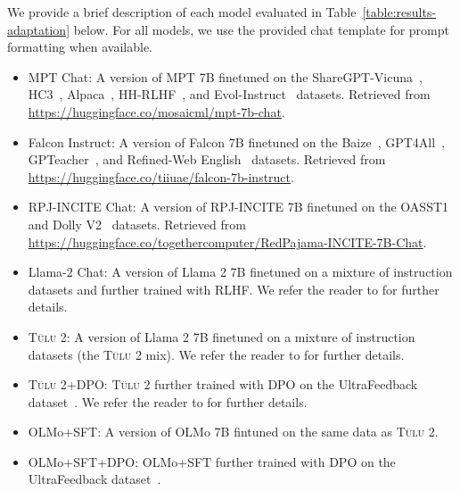 \documentclass[11pt]{article}
\newcommand{\olmo}{OLMo\xspace}
\newcommand{\tulu}{\textsc{T\"ulu}\xspace}
\begin{document}
We provide a brief description of each model evaluated in Table~\ref{table:results-adaptation} below. For all models, we use the provided chat template for prompt formatting when available. 
\begin{itemize}[leftmargin=*]
    \item MPT Chat: A version of MPT 7B finetuned on the ShareGPT-Vicuna~\citep{vicuna2023}, HC3~\citep{guo-etal-2023-hc3}, Alpaca~\citep{alpaca}, HH-RLHF~\citep{bai2022training}, and Evol-Instruct~\citep{xu2024wizardlm} datasets. Retrieved from \url{https://huggingface.co/mosaicml/mpt-7b-chat}.
    \item Falcon Instruct: A version of Falcon 7B finetuned on the Baize~\citep{xu2023baize}, GPT4All~\citep{gpt4all}, GPTeacher~\citep{gpteacher}, and Refined-Web English~\citep{penedo2023therd} datasets. Retrieved from \url{https://huggingface.co/tiiuae/falcon-7b-instruct}.
    \item RPJ-INCITE Chat: A version of RPJ-INCITE 7B finetuned on the OASST1~\citep{kopf2023openassistant} and Dolly V2~\citep{DatabricksBlog2023DollyV2} datasets. Retrieved from \url{https://huggingface.co/togethercomputer/RedPajama-INCITE-7B-Chat}.
    \item Llama-2 Chat: A version of Llama 2 7B finetuned on a mixture of instruction datasets and further trained with RLHF. We refer the reader to \citet{touvron2023llama2} for further details.
    \item \tulu 2: A version of Llama 2 7B finetuned on a mixture of instruction datasets (the \tulu 2 mix). We refer the reader to \citet{ivison2023camels} for further details.
    \item \tulu 2+DPO: \tulu 2 further trained with DPO on the UltraFeedback dataset~\citep{cui2023ultrafeedback}. We refer the reader to \citet{ivison2023camels} for further details.
    \item OLMo+SFT: A version of \olmo 7B fintuned on the same data as \tulu 2.
    \item OLMo+SFT+DPO: OLMo+SFT further trained with DPO on the UltraFeedback dataset~\citep{cui2023ultrafeedback}.
\end{itemize}
\end{document}
